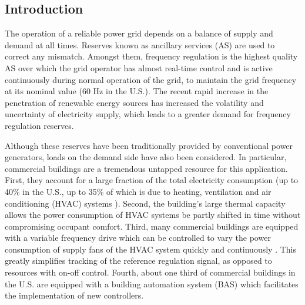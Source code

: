 %


\subsection{Introduction}\label{sec:introduction}

The operation of a reliable power grid depends on a balance of supply and demand at all times. 
Reserves known as ancillary services (AS) are used to correct any mismatch.
Amongst them, frequency regulation is the highest quality AS over which the grid operator has almost real-time control and is active continuously during normal operation of the grid, to maintain the grid frequency at its nominal value (60 Hz in the U.S.).
The recent rapid increase in the penetration of renewable energy sources has increased the volatility and uncertainty of electricity supply, which leads to a greater demand for frequency regulation reserves.

Although these reserves have been traditionally provided by conventional power generators, loads on the demand side have also been considered. 
In particular, commercial buildings are a tremendous untapped resource for this application. 
First, they account for a large fraction of the total electricity consumption (up to 40\% in the U.S., up to 35\% of which is due to heating, ventilation and air conditioning (HVAC) systems \cite{USenergy:2017}). 
Second, the building's large thermal capacity allows the power consumption of HVAC systems be partly shifted in time without compromising occupant comfort. 
Third, many commercial buildings are equipped with a variable frequency drive which can be controlled to vary the power consumption of supply fans of the HVAC system quickly and continuously \cite{Hao:2012demandresponse}. This greatly simplifies tracking of the reference regulation signal, as opposed to resources with on-off control.
Fourth, about one third of commercial buildings in the U.S. are equipped with a building automation system (BAS) \cite{Braun:2012} which facilitates the implementation of new controllers.

